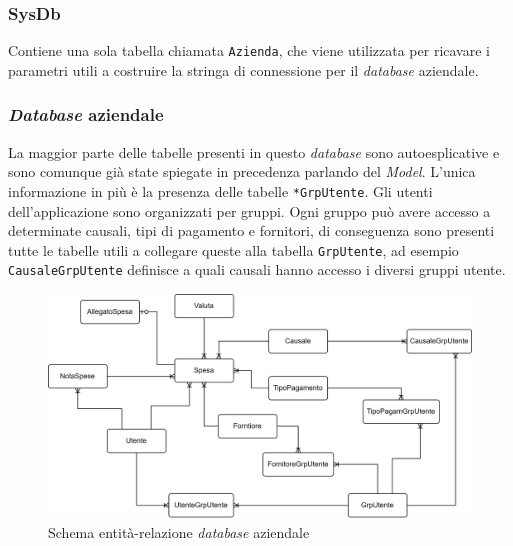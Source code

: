 \subsubsection{SysDb}

Contiene una sola tabella chiamata \texttt{Azienda}, che viene utilizzata per ricavare i parametri utili a costruire la stringa di connessione per il \textit{database} aziendale.

\subsubsection{\textit{Database} aziendale}

La maggior parte delle tabelle presenti in questo \textit{database} sono autoesplicative e sono comunque già state spiegate in precedenza parlando del \textit{Model}. L'unica informazione in più è la presenza delle tabelle \texttt{*GrpUtente}. Gli utenti dell'applicazione sono organizzati per gruppi. Ogni gruppo può avere accesso a determinate causali, tipi di pagamento e fornitori, di conseguenza sono presenti tutte le tabelle utili a collegare queste alla tabella \texttt{GrpUtente}, ad esempio \texttt{CausaleGrpUtente} definisce a quali causali hanno accesso i diversi gruppi utente.

\begin{figure}[H]
    \centering
    \includegraphics[width=\columnwidth]{images/ER moviEXPENSE.png}
    \caption{Schema entità-relazione \textit{database} aziendale}
\end{figure}
